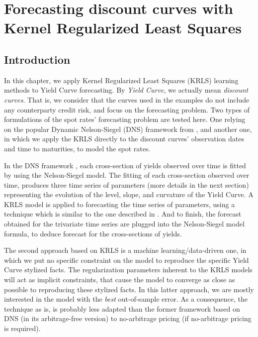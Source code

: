 %
\chapter{Forecasting discount curves with Kernel Regularized Least Squares}
\label{sec:discount_curve_krls}


\section{Introduction}

In this chapter, we apply Kernel Regularized Least Squares (KRLS) learning methods to Yield Curve forecasting. By \textit{Yield Curve}, we actually mean \textit{discount curves}. That is, we consider that the curves used in the examples do not include any counterparty credit risk, and focus on the forecasting problem. Two types of formulations of the spot rates' forecasting problem are tested here. One relying on the popular Dynamic Nelson-Siegel (DNS) framework from \cite{diebold2006forecasting}, and another one, in which we apply the KRLS directly to the discount curves' observation dates and time to maturities, to model the spot rates.

\medskip

In the DNS framework \cite{diebold2006forecasting}, each cross-section of yields observed over time is fitted by using the Nelson-Siegel \cite{nelson1987parsimonious} model. The fitting of each cross-section observed over time, produces three time series of parameters (more details in the next section) representing the evolution of the level, slope, and curvature of the Yield Curve. A KRLS model is applied to forecasting  the time series of parameters, using a technique which is similar to the one described in \cite{exterkate2016nonlinear}. And to finish, the forecast obtained for the trivariate time series are plugged into the Nelson-Siegel model formula, to deduce forecast for the cross-sections of yields.

\medskip

The second approach based on KRLS is a machine learning/data-driven one, in which we put no  specific constraint on the model to reproduce the specific Yield Curve stylized facts. The regularization parameters inherent to the KRLS models will act as implicit constraints, that cause the model to converge as close as possible to reproducing these stylized facts. In this latter approach, we are mostly interested in the model with the {\it best} out-of-sample error. As a consequence, the technique as is, is probably less adapted than the former framework based on DNS (in its arbitrage-free version) to no-arbitrage pricing (if no-arbitrage pricing is required).


